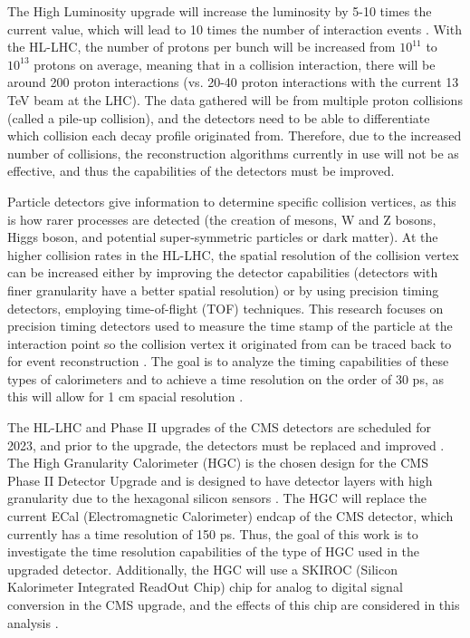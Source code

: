 \documentclass[twocolumn,aps,prd,reprint]{revtex4-1}
\begin{document}
The High Luminosity upgrade will increase the luminosity by 5-10 times the current value, which will lead to 10 times the number of interaction events \cite{Bilki}. With the HL-LHC, the number of protons per bunch will be increased from $10^{11}$ to $10^{13}$ protons on average, meaning that in a collision interaction, there will be around 200 proton interactions (vs. 20-40 proton interactions with the current 13 TeV beam at the LHC). The data gathered will be from multiple proton collisions (called a pile-up collision), and the detectors need to be able to differentiate which collision each decay profile originated from. Therefore, due to the increased number of collisions, the reconstruction algorithms currently in use will not be as effective, and thus the capabilities of the detectors must be improved.

Particle detectors give information to determine specific collision vertices, as this is how rarer processes are detected (the creation of mesons, W and Z bosons, Higgs boson, and potential super-symmetric particles or dark matter). At the higher collision rates in the HL-LHC, the spatial resolution of the collision vertex can be increased either by improving the detector capabilities (detectors with finer granularity have a better spatial resolution) or by using precision timing detectors, employing time-of-flight (TOF) techniques. This research focuses on precision timing detectors used to measure the time stamp of the particle at the interaction point so the collision vertex it originated from can be traced back to for event reconstruction \cite{Xie}. The goal is to analyze the timing capabilities of these types of calorimeters and to achieve a time resolution on the order of 30 ps, as this will allow for 1 cm spacial resolution \cite{Xie}.

The HL-LHC and Phase II upgrades of the CMS detectors are scheduled for 2023, and prior to the upgrade, the detectors must be replaced and improved \cite{Bilki}. The High Granularity Calorimeter (HGC) is the chosen design for the CMS Phase II Detector Upgrade and is designed to have detector layers with high granularity due to the hexagonal silicon sensors \cite{Bilki}. The HGC will replace the current ECal (Electromagnetic Calorimeter) endcap of the CMS detector, which currently has a time resolution of 150 ps. Thus, the goal of this work is to investigate the time resolution capabilities of the type of HGC used in the upgraded detector. Additionally, the HGC will use a SKIROC (Silicon Kalorimeter Integrated ReadOut Chip) chip for analog to digital signal conversion in the CMS upgrade, and the effects of this chip are considered in this analysis \cite{Callier}.
\end{document}
